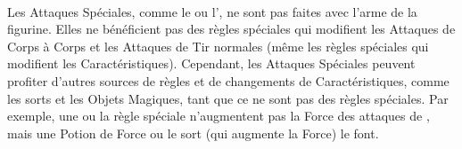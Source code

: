 {\begin{framed}
\begin{multicols}{3}
\hyperlink{notaleader}{\notaleader}\newline
\hyperlink{armourpiercing}{\armourpiercing{}}\newline
\hyperlink{fear}{\fear}\newline
\hyperlink{stomp}{\stomp{}}\newline
\hyperlink{warplatform}{\warplatform}\newline
\hyperlink{reload}{\reload}\newline
\hyperlink{lightningreflexes}{\lightningreflexes}\newline
\hyperlink{regeneration}{\regeneration{}}\newline
\hyperlink{magicresistance}{\magicresistance{}}\newline
\hyperlink{wardsave}{\wardsave{}}\newline
\hyperlink{stupidity}{\stupidity}\newline
\hyperlink{stubborn}{\stubborn}\newline
\hyperlink{terror}{\terror}\newline
\hyperlink{volleyfire}{\volleyfire}\newline
\hyperlink{quicktofire}{\quicktofire}\newline
\hyperlink{multipleshots}{\multipleshots{}}\newline
\hyperlink{skirmisher}{\skirmisher}\newline
\hyperlink{impacthits}{\impacthits{}}\newline
\hyperlink{lighttroops}{\lighttroops}\newline
\hyperlink{fly}{\fly{}}
\end{multicols}
\setlength\columnseprule{0pt}
\vspace*{-10pt}
\end{framed}
}

\paragraph{}

Les Attaques Spéciales, comme le \stomp{} ou l'\breathweapon{}, ne sont pas faites avec l'arme de la figurine. Elles ne bénéficient pas des règles spéciales qui modifient les Attaques de Corps à Corps et les Attaques de Tir normales (même les règles spéciales qui modifient les Caractéristiques). Cependant, les Attaques Spéciales peuvent profiter d'autres sources de règles et de changements de Caractéristiques, comme les sorts et les Objets Magiques, tant que ce ne sont pas des règles spéciales. Par exemple, une \gw{} ou la règle spéciale \thunderouscharge{} n'augmentent pas la Force des attaques de \stomp{}, mais une Potion de Force ou le sort \og \wildernesssignature{} \fg{} (qui augmente la Force) le font.

